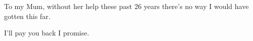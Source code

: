 
\begin{dedication} %

To my Mum, without her help these past 26 years there's no way I would have gotten this far.

I'll pay you back I promise.

\end{dedication}


